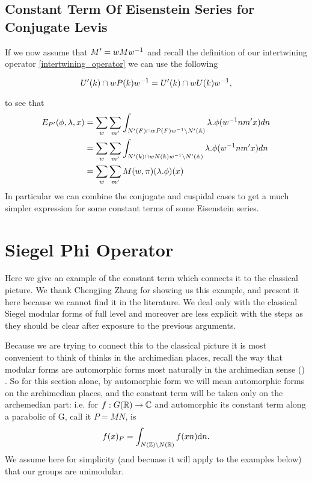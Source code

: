     \subsection{Constant Term Of Eisenstein Series for Conjugate Levis}\label{constant_conjugate_levi}
    If we now assume that \(M' = wMw^{-1}\) and recall the definition of our intertwining operator \ref{intertwining_operator} we can use the following 
    \begin{Lemma}
        \[U'(k) \cap wP(k) w^{-1} = U'(k) \cap wU(k)w^{-1},\]
    \end{Lemma}
    to see that 
    \begin{equation*}
        \begin{aligned}
             E_{P'}( \phi, \lambda, x) &= \sum_{ w} \sum_{m'} \int_{N'(F)\cap wP(F)w\inv \setminus N'(\A)} \lambda.\phi( w\inv nm' x)  dn \\
             &=  \sum_{ w} \sum_{m'} \int_{N'(k) \cap wN(k)w\inv \setminus N'(\A)} \lambda.\phi( w\inv nm' x)  dn \\
             &= \sum_{ w} \sum_{m'} M(w, \pi)(\lambda.\phi)(x)
        \end{aligned}
    \end{equation*}
    In particular we can combine the conjugate and cuspidal cases to get a much simpler expression for some constant terms of some Eisenstein series. 

    
\section{Siegel Phi Operator}
Here we give an example of the constant term which connects it to the classical picture. We thank Chengjing Zhang for showing us this example, and present it here because we cannot find it in the literature.  We deal only with the classical Siegel modular forms of full level and moreover are less explicit with the steps as they should be clear after exposure to the previous arguments. 

Because we are trying to connect this to the classical picture it is most convenient to think of thinks in the archimedian places, recall the way that modular forms are automorphic forms most naturally in the archimedian sense (\cite[6.2]{getzIntroductionAutomorphicRepresentations2024}) \cite{emertonCLASSICALMODULARFORMS}\cite{bumpAutomorphicFormsRepresentations1997}\cite{booherVIEWINGMODULARFORMS}. So for this section alone, by automorphic form we will mean automorphic forms on the archimedian places, and the constant term will be taken only on the archemedian part: i.e. for \(f: G(\R) \to \C\) and automorphic its constant term along a parabolic of G, call it \(P=MN\), is \cite[8.6]{getzIntroductionAutomorphicRepresentations2024}
\[f(x)_P = \int_{N(\Z)\backslash N(\R)}f(xn) \mathrm{d}n.\]
We assume here for simplicity (and becuase it will apply to the examples below) that our groups are unimodular.

